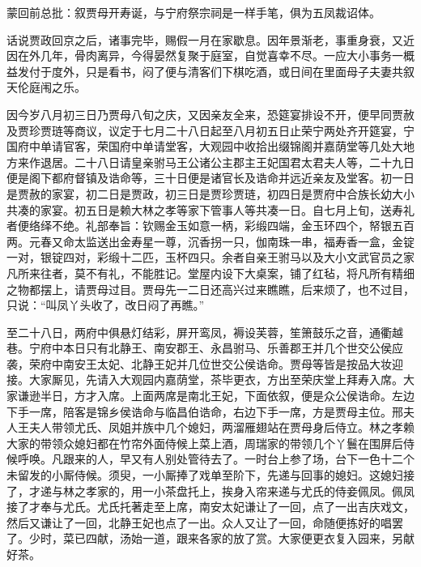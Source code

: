 \begin{parag}
    \begin{note}蒙回前总批：叙贾母开寿诞，与宁府祭宗祠是一样手笔，俱为五凤裁诏体。\end{note}
\end{parag}


\begin{parag}
    话说贾政回京之后，诸事完毕，赐假一月在家歇息。因年景渐老，事重身衰，又近因在外几年，骨肉离异，今得晏然复聚于庭室，自觉喜幸不尽。一应大小事务一概益发付于度外，只是看书，闷了便与清客们下棋吃酒，或日间在里面母子夫妻共叙天伦庭闱之乐。
\end{parag}


\begin{parag}
    因今岁八月初三日乃贾母八旬之庆，又因亲友全来，恐筵宴排设不开，便早同贾赦及贾珍贾琏等商议，议定于七月二十八日起至八月初五日止荣宁两处齐开筵宴，宁国府中单请官客，荣国府中单请堂客，大观园中收拾出缀锦阁并嘉荫堂等几处大地方来作退居。二十八日请皇亲驸马王公诸公主郡主王妃国君太君夫人等，二十九日便是阁下都府督镇及诰命等，三十日便是诸官长及诰命并远近亲友及堂客。初一日是贾赦的家宴，初二日是贾政，初三日是贾珍贾琏，初四日是贾府中合族长幼大小共凑的家宴。初五日是赖大林之孝等家下管事人等共凑一日。自七月上旬，送寿礼者便络绎不绝。礼部奉旨：钦赐金玉如意一柄，彩缎四端，金玉环四个，帑银五百两。元春又命太监送出金寿星一尊，沉香拐一只，伽南珠一串，福寿香一盒，金锭一对，银锭四对，彩缎十二匹，玉杯四只。余者自亲王驸马以及大小文武官员之家凡所来往者，莫不有礼，不能胜记。堂屋内设下大桌案，铺了红毡，将凡所有精细之物都摆上，请贾母过目。贾母先一二日还高兴过来瞧瞧，后来烦了，也不过目，只说：“叫凤丫头收了，改日闷了再瞧。”
\end{parag}


\begin{parag}
    至二十八日，两府中俱悬灯结彩，屏开鸾凤，褥设芙蓉，笙箫鼓乐之音，通衢越巷。宁府中本日只有北静王、南安郡王、永昌驸马、乐善郡王并几个世交公侯应袭，荣府中南安王太妃、北静王妃并几位世交公侯诰命。贾母等皆是按品大妆迎接。大家厮见，先请入大观园内嘉荫堂，茶毕更衣，方出至荣庆堂上拜寿入席。大家谦逊半日，方才入席。上面两席是南北王妃，下面依叙，便是众公侯诰命。左边下手一席，陪客是锦乡侯诰命与临昌伯诰命，右边下手一席，方是贾母主位。邢夫人王夫人带领尤氏、凤姐并族中几个媳妇，两溜雁翅站在贾母身后侍立。林之孝赖大家的带领众媳妇都在竹帘外面侍候上菜上酒，周瑞家的带领几个丫鬟在围屏后侍候呼唤。凡跟来的人，早又有人别处管待去了。一时台上参了场，台下一色十二个未留发的小厮侍候。须臾，一小厮捧了戏单至阶下，先递与回事的媳妇。这媳妇接了，才递与林之孝家的，用一小茶盘托上，挨身入帘来递与尤氏的侍妾佩凤。佩凤接了才奉与尤氏。尤氏托著走至上席，南安太妃谦让了一回，点了一出吉庆戏文，然后又谦让了一回，北静王妃也点了一出。众人又让了一回，命随便拣好的唱罢了。少时，菜已四献，汤始一道，跟来各家的放了赏。大家便更衣复入园来，另献好茶。
\end{parag}


